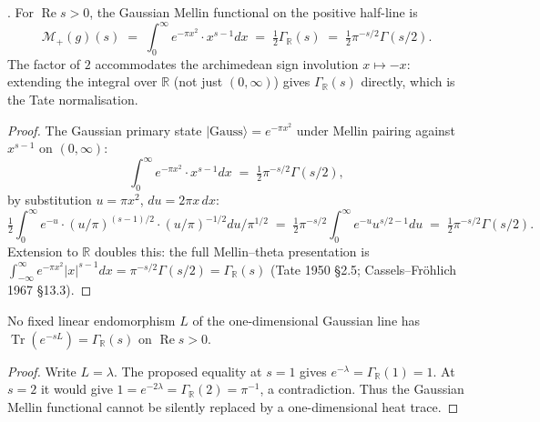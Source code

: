 \begin{proposition}
\label{v4-arith:prim-zeta:prop:arch-char}
\ClaimStatusProvedHere. For \(\operatorname{Re}s>0\), the Gaussian
Mellin functional on the positive half-line is
\begin{equation}
\label{v4-arith:prim-zeta:eq:arch-char}
\mathcal M_+(g)(s)
\;=\;\int_{0}^{\infty}e^{-\pi x^{2}}\cdot x^{s-1}dx
\;=\;\tfrac{1}{2}\Gamma_{\mathbb{R}}(s)
\;=\;\tfrac{1}{2}\pi^{-s/2}\Gamma(s/2).
\end{equation}
The factor of \(2\) accommodates the archimedean sign involution
\(x\mapsto -x\): extending the integral over \(\mathbb{R}\) (not just
\((0,\infty)\)) gives \(\Gamma_{\mathbb{R}}(s)\) directly, which is the
Tate normalisation.
\end{proposition}

\begin{proof}
The Gaussian primary state \(|\text{Gauss}\rangle=e^{-\pi x^{2}}\)
under Mellin pairing against \(x^{s-1}\) on \((0,\infty)\):
\begin{equation}
\int_{0}^{\infty}e^{-\pi x^{2}}\cdot x^{s-1}dx
\;=\;\tfrac{1}{2}\pi^{-s/2}\Gamma(s/2),
\end{equation}
by substitution \(u=\pi x^{2}\), \(du=2\pi x\,dx\):
\begin{equation}
\tfrac{1}{2}\int_{0}^{\infty}e^{-u}\cdot(u/\pi)^{(s-1)/2}\cdot(u/\pi)^{-1/2}du/\pi^{1/2}
\;=\;\tfrac{1}{2}\pi^{-s/2}\int_{0}^{\infty}e^{-u}u^{s/2-1}du
\;=\;\tfrac{1}{2}\pi^{-s/2}\Gamma(s/2).
\end{equation}
Extension to \(\mathbb{R}\) doubles this: the full
Mellin--theta presentation is \(\int_{-\infty}^{\infty}e^{-\pi x^{2}}|x|^{s-1}dx=\pi^{-s/2}\Gamma(s/2)=\Gamma_{\mathbb{R}}(s)\)
(Tate 1950 \S2.5; Cassels--Fr\"ohlich 1967 \S13.3).
\end{proof}

\begin{proposition}
\label{v4-arith:prim-zeta:gaussian-line-obstruction}
No fixed linear endomorphism \(L\) of the one-dimensional Gaussian
line has \(\operatorname{Tr}(e^{-sL})=\Gamma_{\mathbb R}(s)\) on
\(\operatorname{Re}s>0\).
\end{proposition}
\begin{proof}
Write \(L=\lambda\). The proposed equality at \(s=1\) gives
\(e^{-\lambda}=\Gamma_{\mathbb R}(1)=1\). At \(s=2\) it would give
\(1=e^{-2\lambda}=\Gamma_{\mathbb R}(2)=\pi^{-1}\), a contradiction.
Thus the Gaussian Mellin functional cannot be silently replaced by a
one-dimensional heat trace.
\end{proof}

